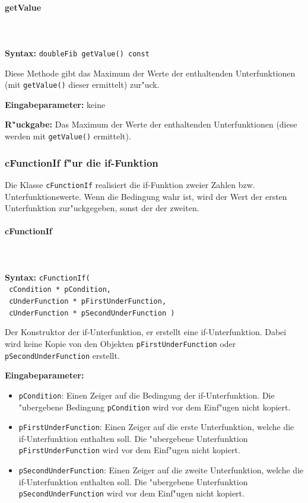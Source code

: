 \paragraph{getValue}

\ \\\\\noindent
\textbf{Syntax:} \verb|doubleFib getValue() const|

\bigskip\noindent
Diese Methode gibt das Maximum der Werte der enthaltenden Unterfunktionen (mit \verb|getValue()| dieser ermittelt) zur"uck.

\bigskip\noindent
\textbf{Eingabeparameter:} keine

\bigskip\noindent
\textbf{R"uckgabe:} Das Maximum der Werte der enthaltenden Unterfunktionen (diese werden mit \verb|getValue()| ermittelt).




\subsubsection{cFunctionIf f"ur die if-Funktion}

Die Klasse \verb|cFunctionIf| realisiert die if-Funktion zweier Zahlen bzw. Unterfunktionswerte. Wenn die Bedingung wahr ist, wird der Wert der ersten Unterfunktion zur"uckgegeben, sonst der der zweiten.

\paragraph{cFunctionIf}

\ \\\\\noindent
\textbf{Syntax:} \verb|cFunctionIf(| \\\verb| cCondition * pCondition,| \\\verb| cUnderFunction * pFirstUnderFunction,| \\\verb| cUnderFunction * pSecondUnderFunction )|

\bigskip\noindent
Der Konstruktor der if-Unterfunktion, er erstellt eine if-Unterfunktion.
Dabei wird keine Kopie von den Objekten \verb|pFirstUnderFunction| oder \verb|pSecondUnderFunction| erstellt.

\bigskip\noindent
\textbf{Eingabeparameter:}
\begin{itemize}
 \item \verb|pCondition|: Einen Zeiger auf die Bedingung der if-Unterfunktion. Die "ubergebene Bedingung \verb|pCondition| wird vor dem Einf"ugen nicht kopiert.
 \item \verb|pFirstUnderFunction|: Einen Zeiger auf die erste Unterfunktion, welche die if-Unterfunktion enthalten soll. Die "ubergebene Unterfunktion \verb|pFirstUnderFunction| wird vor dem Einf"ugen nicht kopiert.
 \item \verb|pSecondUnderFunction|: Einen Zeiger auf die zweite Unterfunktion, welche die if-Unterfunktion enthalten soll. Die "ubergebene Unterfunktion \verb|pSecondUnderFunction| wird vor dem Einf"ugen nicht kopiert.
\end{itemize}

